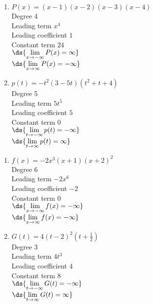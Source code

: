 \documentclass{ximera}
\begin{document}
\begin{enumerate}
\setcounter{enumi}{\value{HW}}


\item $P(x) = (x - 1)(x - 2)(x - 3)(x - 4)$\\
Degree 4 \\
Leading term $x^{4}$\\
Leading coefficient $1$\\
Constant term $24$\\
$\ds{\lim_{x \rightarrow - \infty} P(x)  = \infty}$ \\
$\ds{\lim_{x \rightarrow  \infty} P(x)  = -\infty}$ \\


\item $p(t) = -t^2(3 - 5t)(t^{2} + t + 4)$\\
Degree 5 \\
Leading term $5t^{5}$\\
Leading coefficient $5$\\
Constant term $0$\\
$\ds{\lim_{t \rightarrow - \infty} p(t)  = -\infty}$ \\
$\ds{\lim_{t \rightarrow  \infty} p(t)  = \infty}$ \\

\setcounter{HW}{\value{enumi}}
\end{enumerate}



\begin{enumerate}
\setcounter{enumi}{\value{HW}}

\item $f(x) = -2x^3(x+1)(x+2)^2$ \\
Degree 6 \\
Leading term $-2x^{6}$\\
Leading coefficient $-2$\\
Constant term $0$\\
$\ds{\lim_{x \rightarrow - \infty} f(x)  = -\infty}$ \\
$\ds{\lim_{x \rightarrow  \infty} f(x)  = -\infty}$ \\

\item $G(t) = 4(t-2)^2\left(t+\frac{1}{2}\right)$ \\
Degree 3 \\
Leading term $4t^3$\\
Leading coefficient $4$\\
Constant term $8$\\
$\ds{\lim_{t \rightarrow - \infty} G(t)  = -\infty}$ \\
$\ds{\lim_{t \rightarrow  \infty} G(t)  = \infty}$ \\


\setcounter{HW}{\value{enumi}}
\end{enumerate}
\end{document}
